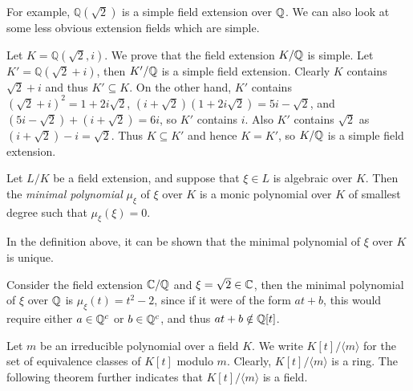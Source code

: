 For example, \(\mathbb{Q}(\sqrt{2})\) is a simple field extension over \(\mathbb Q\). We can also look at some less obvious extension fields which are simple.
\begin{example}
Let  \(K = \mathbb{Q}(\sqrt{2}, i)\). We prove that the field extension $K/\mathbb Q$ is simple. Let \(K' = \mathbb{Q}(\sqrt{2} + i)\), then $K'/\mathbb Q$ is a simple field extension. Clearly $K$ contains $\sqrt 2 + i$ and thus $K' \subseteq K$. On the other hand, \(K'\) contains
$(\sqrt{2} + i)^2 = 1 + 2i\sqrt{2}$, $(i + \sqrt{2})(1+2i\sqrt{2}) = 5i - \sqrt{2}$, and 
$(5i - \sqrt{2}) + (i + \sqrt{2}) = 6i$, 
so \(K'\) contains \(i\). Also \(K'\) contains \(\sqrt{2}\) as \((i+\sqrt{2})-i = \sqrt{2}\). Thus $K \subseteq K'$ and hence  \(K = K'\), so \( K  /\mathbb Q\) is a simple field extension.
\end{example}


\begin{definition}
    Let $L / K$ be a field extension, and suppose that $\xi \in L$ is algebraic over $K$. Then the \textit{minimal polynomial} $\mu_\xi$  of $\xi$ over $K$ is a monic polynomial over $K$ of smallest degree such that $\mu_\xi(\xi)=0$.
\end{definition}
In the definition above, it can be shown that the minimal polynomial of $\xi$ over $K$ is unique. 


\begin{example}
    Consider the field extension $\mathbb C / \mathbb Q$ and $\xi = \sqrt{2} \in \mathbb C$, then the minimal polynomial of $\xi$ over $\mathbb Q$ is $\mu_\xi(t)=t^2-2$, since if it were of the form $at+b$, this would require either $a \in \mathbb Q^c$ or $b \in \mathbb Q^c$, and thus $at+b \notin \mathbb Q[t]$.
\end{example}

Let $m$ be an irreducible polynomial over a field $K$. We write
$
K[t] /\langle m\rangle
$
for the set of equivalence classes of $K[t]$ modulo $m$. Clearly, $K[t] /\langle m\rangle$ is a ring. 
The following theorem further indicates that $K[t] / \langle m \rangle$ is a field. 


